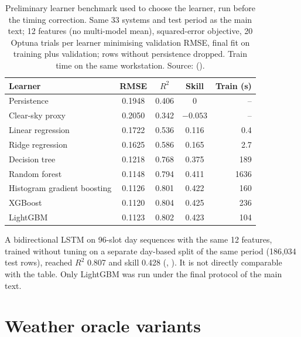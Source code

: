 \begin{table}[H]
\centering
\caption{Preliminary learner benchmark used to choose the learner, run before the timing correction. Same 33 systems and test period as the main text; 12 features (no multi-model mean), squared-error objective, 20 Optuna trials per learner minimising validation RMSE, final fit on training plus validation; rows without persistence dropped. Train time on the same workstation. Source:  ().}
\label{tab:s-learners}
\small
\begin{tabular}{@{}l c c c r@{}}
\toprule
Learner & RMSE & $R^2$ & Skill & Train (s) \\
\midrule
Persistence & 0.1948 & 0.406 & 0 & -- \\
Clear-sky proxy & 0.2050 & 0.342 & $-0.053$ & -- \\
Linear regression & 0.1722 & 0.536 & 0.116 & 0.4 \\
Ridge regression & 0.1625 & 0.586 & 0.165 & 2.7 \\
Decision tree & 0.1218 & 0.768 & 0.375 & 189 \\
Random forest & 0.1148 & 0.794 & 0.411 & 1636 \\
Histogram gradient boosting & 0.1126 & 0.801 & 0.422 & 160 \\
XGBoost & 0.1120 & 0.804 & 0.425 & 236 \\
LightGBM & 0.1123 & 0.802 & 0.423 & 104 \\
\bottomrule
\end{tabular}
\end{table}

A bidirectional LSTM on 96-slot day sequences with the same 12 features, trained without tuning on a separate day-based split of the same period (186,034 test rows), reached $R^2$ 0.807 and skill 0.428 (, ). It is not directly comparable with the table. Only LightGBM was run under the final protocol of the main text.

\section{Weather oracle variants}
\label{sec:s-oracles}

